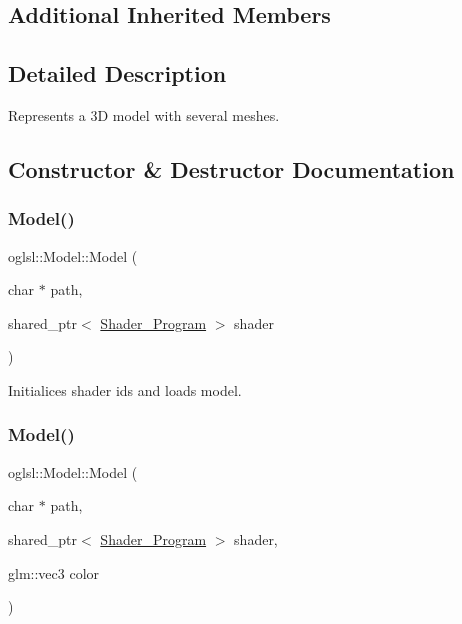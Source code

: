 \subsection*{Additional Inherited Members}


\subsection{Detailed Description}
Represents a 3D model with several meshes. 

\subsection{Constructor \& Destructor Documentation}
\mbox{\label{classoglsl_1_1_model_a1d1c934e59303cf5782cc3b45f80e462}} 
\subsubsection{\texorpdfstring{Model()}{Model()}\hspace{0.1cm}{\footnotesize\ttfamily [1/2]}}
{\footnotesize\ttfamily oglsl\+::\+Model\+::\+Model (\begin{DoxyParamCaption}\item[{char $\ast$}]{path,  }\item[{shared\+\_\+ptr$<$ \mbox{\hyperlink{classoglsl_1_1_shader___program}{Shader\+\_\+\+Program}} $>$}]{shader }\end{DoxyParamCaption})\hspace{0.3cm}{\ttfamily [inline]}}



Initialices shader ids and loads model. 

\mbox{\label{classoglsl_1_1_model_ab3c8fe28157eaa2fd01646a0fc081f0f}} 
\subsubsection{\texorpdfstring{Model()}{Model()}\hspace{0.1cm}{\footnotesize\ttfamily [2/2]}}
{\footnotesize\ttfamily oglsl\+::\+Model\+::\+Model (\begin{DoxyParamCaption}\item[{char $\ast$}]{path,  }\item[{shared\+\_\+ptr$<$ \mbox{\hyperlink{classoglsl_1_1_shader___program}{Shader\+\_\+\+Program}} $>$}]{shader,  }\item[{glm\+::vec3}]{color }\end{DoxyParamCaption})\hspace{0.3cm}{\ttfamily [inline]}}



